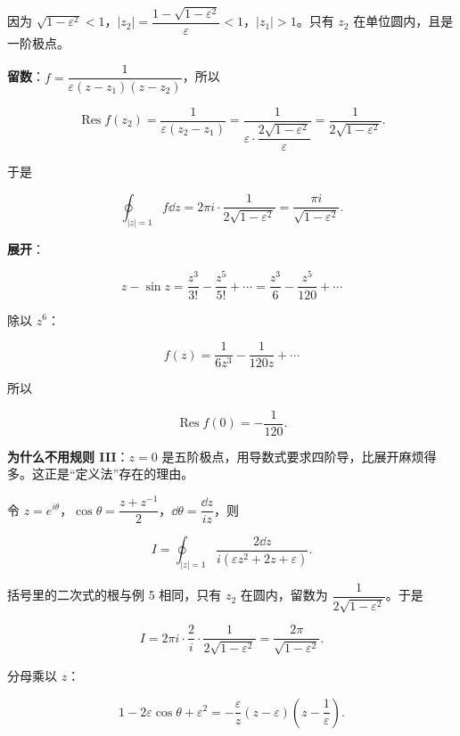 \documentclass[11pt]{ctexart}
\renewcommand{\qbreak}{\needspace{0.45\textheight}}
\let\orighdr\hdr
\renewcommand{\hdr}[2]{\par\orighdr{#1}{#2}}
\begin{document}
因为 $\sqrt{1-\varepsilon^{2}}<1$，$|z_{2}|=\dfrac{1-\sqrt{1-\varepsilon^{2}}}{\varepsilon}<1$，$|z_{1}|>1$。只有 $z_2$ 在单位圆内，且是一阶极点。

\textbf{留数}：$f=\dfrac{1}{\varepsilon(z-z_{1})(z-z_{2})}$，所以

\[ \operatorname{Res}f(z_2)=\frac{1}{\varepsilon(z_2-z_1)}=\frac{1}{\varepsilon\cdot\dfrac{2\sqrt{1-\varepsilon^{2}}}{\varepsilon}}=\frac{1}{2\sqrt{1-\varepsilon^{2}}} . \]

于是

\[ \oint_{|z|=1}f\dd z=2\pi i\cdot\frac{1}{2\sqrt{1-\varepsilon^{2}}}=\frac{\pi i}{\sqrt{1-\varepsilon^{2}}} . \]

\qbreak
{}

\textbf{展开}：

\[ z-\sin z=\frac{z^{3}}{3!}-\frac{z^{5}}{5!}+\cdots=\frac{z^{3}}{6}-\frac{z^{5}}{120}+\cdots \]

除以 $z^{6}$：

\[ f(z)=\frac{1}{6z^{3}}-\frac{1}{120z}+\cdots \]

所以

\[ \operatorname{Res}f(0)=-\frac{1}{120} . \]

\textbf{为什么不用规则 III}：$z=0$ 是五阶极点，用导数式要求四阶导，比展开麻烦得多。这正是“定义法”存在的理由。


\qbreak
{}

令 $z=e^{i\theta}$，$\cos\theta=\dfrac{z+z^{-1}}{2}$，$\dd\theta=\dfrac{\dd z}{iz}$，则

\[ I=\oint_{|z|=1}\frac{2\dd z}{i(\varepsilon z^{2}+2z+\varepsilon)} . \]

括号里的二次式的根与例 5 相同，只有 $z_2$ 在圆内，留数为 $\dfrac{1}{2\sqrt{1-\varepsilon^{2}}}$。于是

\[ I=2\pi i\cdot\frac{2}{i}\cdot\frac{1}{2\sqrt{1-\varepsilon^{2}}}=\frac{2\pi}{\sqrt{1-\varepsilon^{2}}} . \]

\qbreak
{}

分母乘以 $z$：

\[ 1-2\varepsilon\cos\theta+\varepsilon^{2}=-\frac{\varepsilon}{z}(z-\varepsilon)\left(z-\frac1\varepsilon\right) . \]
\end{document}
